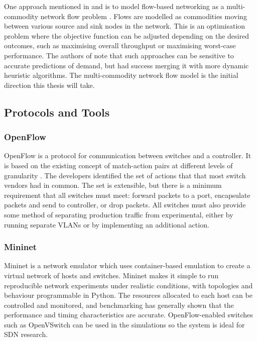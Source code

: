 \documentclass[pdftex,12pt,a4paper]{article}
\begin{document}
One approach mentioned in \cite{wellons:augmenting} and \cite{dai:dynamic} is to model flow-based networking as a multi-commodity network flow problem \cite[pp. 862--863]{cormen:algorithms}. Flows are modelled as commodities moving between various source and sink nodes in the network. This is an optimisation problem where the objective function can be adjusted depending on the desired outcomes, such as maximising overall throughput or maximising worst-case performance. The authors of \cite{wellons:augmenting} note that such approaches can be sensitive to accurate predictions of demand, but had success merging it with more dynamic heuristic algorithms. The multi-commodity network flow model is the initial direction this thesis will take.

\newpage
\subsection{Protocols and Tools}
\subsubsection{OpenFlow}
OpenFlow \cite{onf:switch140} is a protocol for communication between switches and a controller. It is based on the existing concept of match-action pairs at different levels of granularity \cite{mckeown:sdn}. The developers identified the set of actions that that most switch vendors had in common. The set is extensible, but there is a minimum requirement that all switches must meet: forward packets to a port, encapsulate packets and send to controller, or drop packets. All switches must also provide some method of separating production traffic from experimental, either by running separate VLANs or by implementing an additional action.

\subsubsection{Mininet}
Mininet is a network emulator which uses container-based emulation \cite{handigol:mininet} to create a virtual network of hosts and switches. Mininet makes it simple to run reproducible network experiments under realistic conditions, with topologies and behaviour programmable in Python. The resources allocated to each host can be controlled and monitored, and benchmarking \cite{handigol:benchmarks} has generally shown that the performance and timing characteristics are accurate. OpenFlow-enabled switches such as OpenVSwitch can be used in the simulations so the system is ideal for SDN research.
\end{document}
